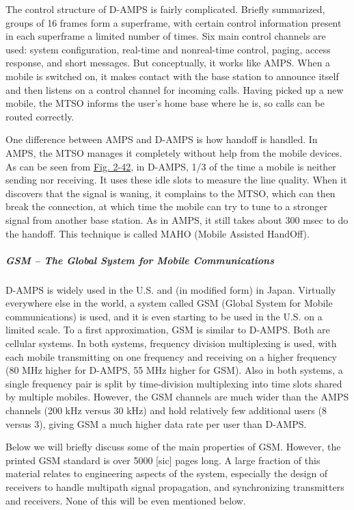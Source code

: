 \documentclass[b5paper,11pt]{memoir}
\begin{document}
The control structure of D-AMPS is fairly complicated. Briefly
summarized, groups of 16 frames form a superframe, with certain control
information present in each superframe a limited number of times. Six
main control channels are used: system configuration, real-time and
nonreal-time control, paging, access response, and short messages. But
conceptually, it works like AMPS. When a mobile is switched on, it makes
contact with the base station to announce itself and then listens on a
control channel for incoming calls. Having picked up a new mobile, the
MTSO informs the user's home base where he is, so calls can be routed
correctly.

One difference between AMPS and D-AMPS is how handoff is handled. In
AMPS, the MTSO manages it completely without help from the mobile
devices. As can be seen from
\protect\hyperlink{0130661023_ch02lev1sec6.htmlux5cux23ch02fig42}{Fig.
2-42}, in D-AMPS, 1/3 of the time a mobile is neither sending nor
receiving. It uses these idle slots to measure the line quality. When it
discovers that the signal is waning, it complains to the MTSO, which can
then break the connection, at which time the mobile can try to tune to a
stronger signal from another base station. As in AMPS, it still takes
about 300 msec to do the handoff. This technique is called {MAHO}
({Mobile Assisted HandOff}).

\protect\hypertarget{0130661023_ch02lev1sec6.htmlux5cux23ch02lev3sec23}{}{}

\subparagraph{GSM -- The Global System for Mobile Communications}

D-AMPS is widely used in the U.S. and (in modified form) in Japan.
Virtually everywhere else in the world, a system called {GSM} ({Global
System for Mobile communications}) is used, and it is even starting to
be used in the U.S. on a limited scale. To a first approximation, GSM is
similar to D-AMPS. Both are cellular systems. In both systems, frequency
division multiplexing is used, with each mobile transmitting on one
frequency and receiving on a higher frequency (80 MHz higher for D-AMPS,
55 MHz higher for GSM). Also in both systems, a single frequency pair is
split by time-division multiplexing into time slots shared by multiple
mobiles. However, the GSM channels are much wider than the AMPS channels
(200 kHz versus 30 kHz) and hold relatively few additional users (8
versus 3), giving GSM a much higher data rate per user than D-AMPS.

Below we will briefly discuss some of the main properties of GSM.
However, the printed GSM standard is over 5000 {[}sic{]} pages long. A
large fraction of this material relates to engineering aspects of the
system, especially the design of receivers to handle multipath signal
propagation, and synchronizing transmitters and receivers. None of this
will be even mentioned below.
\end{document}
